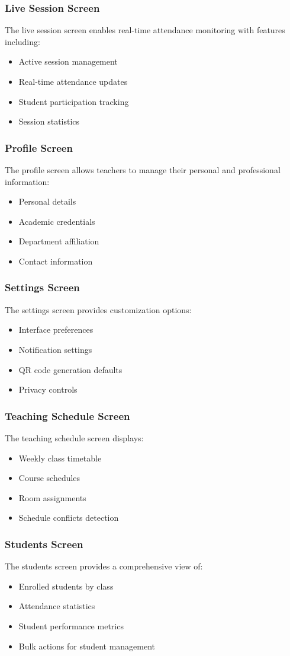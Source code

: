 \subsubsection{Live Session Screen}
The live session screen enables real-time attendance monitoring with features including:
\begin{itemize}
    \item Active session management
    \item Real-time attendance updates
    \item Student participation tracking
    \item Session statistics
\end{itemize}

\subsubsection{Profile Screen}
The profile screen allows teachers to manage their personal and professional information:
\begin{itemize}
    \item Personal details
    \item Academic credentials
    \item Department affiliation
    \item Contact information
\end{itemize}

\subsubsection{Settings Screen}
The settings screen provides customization options:
\begin{itemize}
    \item Interface preferences
    \item Notification settings
    \item QR code generation defaults
    \item Privacy controls
\end{itemize}

\subsubsection{Teaching Schedule Screen}
The teaching schedule screen displays:
\begin{itemize}
    \item Weekly class timetable
    \item Course schedules
    \item Room assignments
    \item Schedule conflicts detection
\end{itemize}

\subsubsection{Students Screen}
The students screen provides a comprehensive view of:
\begin{itemize}
    \item Enrolled students by class
    \item Attendance statistics
    \item Student performance metrics
    \item Bulk actions for student management
\end{itemize}